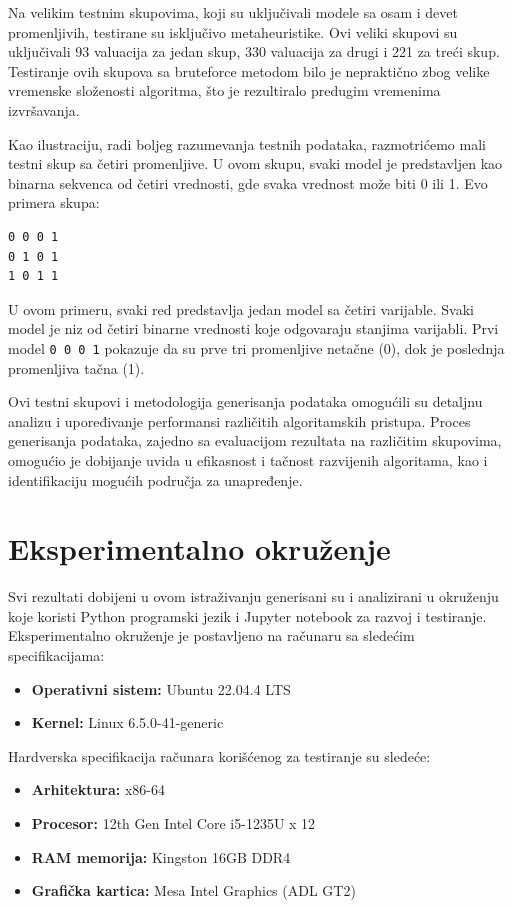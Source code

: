 \documentclass[12pt,oneside]{memoir}
\begin{document}
Na velikim testnim skupovima, koji su uključivali modele sa osam i devet promenljivih, testirane su isključivo metaheuristike. Ovi veliki skupovi su uključivali 93 valuacija za jedan skup, 330 valuacija za drugi i 221 za treći skup. Testiranje ovih skupova sa bruteforce metodom bilo je nepraktično zbog velike vremenske složenosti algoritma, što je rezultiralo predugim vremenima izvršavanja. 

Kao ilustraciju, radi boljeg razumevanja testnih podataka, razmotrićemo mali testni skup sa četiri promenljive. U ovom skupu, svaki model je predstavljen kao binarna sekvenca od četiri vrednosti, gde svaka vrednost može biti 0 ili 1. Evo primera skupa:

\begin{verbatim}
0 0 0 1
0 1 0 1
1 0 1 1
\end{verbatim}

U ovom primeru, svaki red predstavlja jedan model sa četiri varijable. Svaki model je niz od četiri binarne vrednosti koje odgovaraju stanjima varijabli. Prvi model \texttt{0 0 0 1} pokazuje da su prve tri promenljive netačne (0), dok je poslednja promenljiva tačna (1).


Ovi testni skupovi i metodologija generisanja podataka omogućili su detaljnu analizu i upoređivanje performansi različitih algoritamskih pristupa. Proces generisanja podataka, zajedno sa evaluacijom rezultata na različitim skupovima, omogućio je dobijanje uvida u efikasnost i tačnost razvijenih algoritama, kao i identifikaciju mogućih područja za unapređenje.

\section{Eksperimentalno okruženje}
Svi rezultati dobijeni u ovom istraživanju generisani su i analizirani u okruženju koje koristi Python programski jezik i Jupyter notebook za razvoj i testiranje. Eksperimentalno okruženje je postavljeno na računaru sa sledećim specifikacijama:
\begin{itemize}
    \item \textbf{Operativni sistem:} Ubuntu 22.04.4 LTS
    \item \textbf{Kernel:} Linux 6.5.0-41-generic
\end{itemize}

Hardverska specifikacija računara korišćenog za testiranje su sledeće:
\begin{itemize}
    \item \textbf{Arhitektura:} x86-64
    \item \textbf{Procesor:} 12th Gen Intel Core i5-1235U x 12
    \item \textbf{RAM memorija:} Kingston 16GB DDR4
    \item \textbf{Grafička kartica:} Mesa Intel Graphics (ADL GT2)
\end{itemize}
\end{document}

